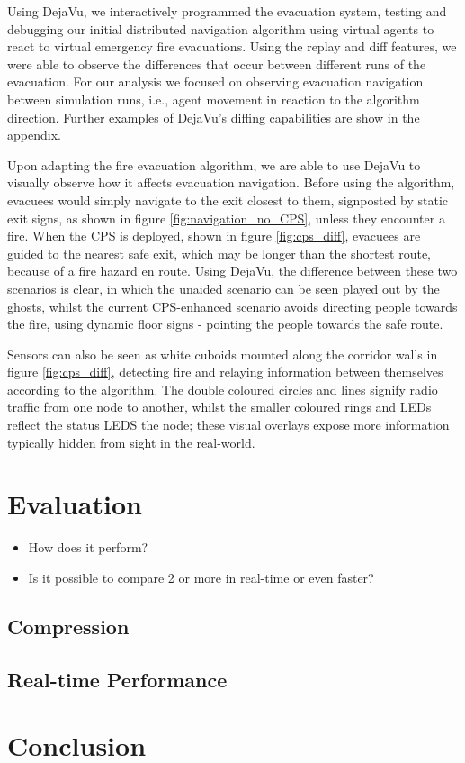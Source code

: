 Using DejaVu, we interactively programmed the evacuation system, testing and debugging our initial distributed navigation algorithm using virtual agents to react to virtual emergency fire evacuations.
Using the replay and diff features, we were able to observe the differences that occur between different runs of the evacuation. For our analysis we focused on observing evacuation navigation between simulation runs, i.e., agent movement in reaction to the algorithm direction. Further examples of DejaVu's diffing capabilities are show in the appendix.

Upon adapting the fire evacuation algorithm, we are able to use DejaVu to visually observe how it affects evacuation navigation. Before using the algorithm, evacuees would simply navigate to the exit closest to them, signposted by static exit signs, as shown in figure \ref{fig:navigation_no_CPS}, unless they encounter a fire. When the CPS is deployed, shown in figure \ref{fig:cps_diff}, evacuees are guided to the nearest safe exit, which may be longer than the shortest route, because of a fire hazard en route. Using DejaVu, the difference between these two scenarios is clear, in which the unaided scenario can be seen played out by the ghosts, whilst the current CPS-enhanced scenario avoids directing people towards the fire, using dynamic floor signs - pointing the people towards the safe route.

Sensors can also be seen as white cuboids mounted along the corridor walls in figure \ref{fig:cps_diff}, detecting fire and relaying information between themselves according to the algorithm. The double coloured circles and lines signify radio traffic from one node to another, whilst the smaller coloured rings and LEDs reflect the status LEDS the node; these visual overlays expose more information typically hidden from sight in the real-world.

\section{Evaluation}
\label{sec:Evaluation}
\begin{itemize}
  \item How does it perform?
  \item Is it possible to compare 2 or more in real-time or even faster?
\end{itemize}

\subsection{Compression} %
\label{sub:compression}


\subsection{Real-time Performance} %
\label{sub:real_time_performance}


\section{Conclusion}
\label{sec:Conclusion}
